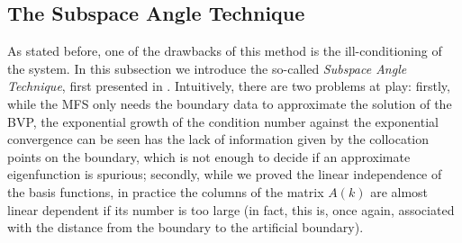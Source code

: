 \subsection{The Subspace Angle Technique}

As stated before, one of the drawbacks of this method is the ill-conditioning of the system. In this subsection we introduce the so-called \textit{Subspace Angle Technique}, first presented in \cite{betcke2005reviving}. Intuitively, there are two problems at play: firstly, while the \ac{MFS} only needs the boundary data to approximate the solution of the \ac{BVP}, the exponential growth of the condition number against the exponential convergence can be seen has the lack of information given by the collocation points on the boundary, which is not enough to decide if an approximate eigenfunction is spurious; secondly, while we proved the linear independence of the basis functions, in practice the columns of the matrix \(A(k)\) are almost linear dependent if its number is too large (in fact, this is, once again, associated with the distance from the boundary to the artificial boundary).

